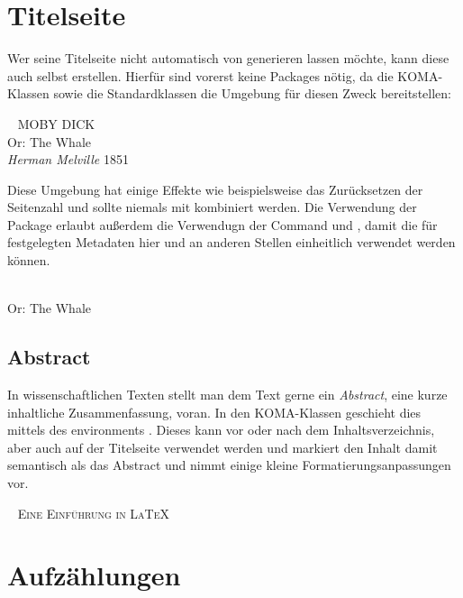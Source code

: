 \section{Titelseite}
Wer seine Titelseite nicht automatisch von  generieren lassen möchte, kann diese auch selbst erstellen.
Hierfür sind vorerst keine Packages nötig, da die KOMA-Klassen sowie die Standardklassen die Umgebung  für diesen Zweck bereitstellen:
\begin{latexlisting}
	\begin{titlepage}
		\centering
		~\vfill
		{
			\Huge
			\scshape
			MOBY DICK
		}\\
		\bigskip
		{
			\Large
			Or: The Whale
		}\\
		\vspace{2cm}
		{
			\itshape
			Herman Melville
		}
		\vfill
		1851
	\end{titlepage}
\end{latexlisting}
Diese Umgebung hat einige Effekte wie beispielsweise das Zurücksetzen der Seitenzahl und sollte niemals mit  kombiniert werden.
Die Verwendung der Package  erlaubt außerdem die Verwendugn der Command  und , damit die für  festgelegten Metadaten hier  und an anderen Stellen einheitlich verwendet werden können.
\begin{latexlisting}
	\begin{titlepage}
		\centering
		~\vfill
		{
			\Huge
			\thetitle
		}\\
		\bigskip
		{
			\Large
			Or: The Whale
		}\\
		\vspace{2cm}
		{
			\itshape
			\theautor
		}
		\vfill
		\thedate
	\end{titlepage}
\end{latexlisting}

\subsection{Abstract}
In wissenschaftlichen Texten stellt man dem Text gerne ein \emph{Abstract}, eine kurze inhaltliche Zusammenfassung, voran.
In den KOMA-Klassen geschieht dies mittels des environments .
Dieses kann vor oder nach dem Inhaltsverzeichnis, aber auch auf der Titelseite verwendet werden und markiert den Inhalt damit semantisch als das Abstract und nimmt einige kleine Formatierungsanpassungen vor.
\begin{latexlisting}
	\begin{titlepage}
		\centering
		~\vfill
		{
			\Huge
			\scshape
			Eine Einführung in \LaTeX{}
		}
		\vfill
		\begin{abstract}
			In diesem Dokument diskutieren wir Grundlagen der Textsatzprogrammsammlung \LaTeX{}.
		\end{abstract}
		\vfill
	\end{titlepage}
\end{latexlisting}



\section{Aufzählungen}
